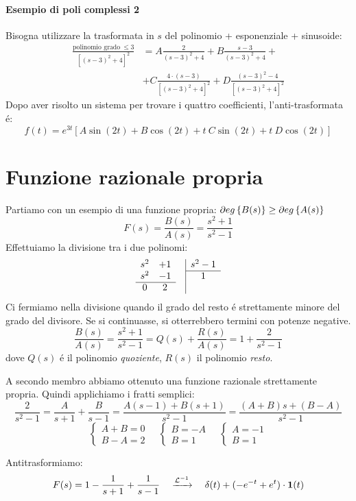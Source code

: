\documentclass[../main.tex]{subfiles}
\begin{document}
		\begin{mdframed}[style=Esempio]
			\paragraph{Esempio di poli complessi 2}
			Bisogna utilizzare la trasformata in $ s $ del polinomio + esponenziale + sinusoide:
			\begin{align*}
				\frac{\text{polinomio grado}\: \leq 3}{[(s-3)^2 + 4]^2} &= A \frac{2}{(s-3)^2 + 4} + B \frac{s - 3}{(s-3)^2 + 4} +
				\\
				&+ C \frac{4 \cdot (s-3)}{[(s-3)^2 + 4]^2} + D \frac{(s - 3)^2 - 4}{[(s-3)^2 + 4]^2}
			\end{align*}
			Dopo aver risolto un sistema per trovare i quattro coefficienti, l'anti-trasformata \'{e}:
			\[
				f(t) = e^{3t} [A \sin(2t) + B \cos(2t) + t\ C \sin(2t) + t\ D \cos(2t)]
			\]
		\end{mdframed}
	\section{Funzione razionale propria}
		\begin{mdframed}[style=Esempio]
			Partiamo con un esempio di una funzione propria: $ \partial eg \left\lbrace B(s) \right\rbrace \geq \partial eg \left\lbrace A(s) \right\rbrace $
			\[
				F(s) = \frac{B(s)}{A(s)} = \frac{s^2+1}{s^2-1}
			\]
			Effettuiamo la divisione tra i due polinomi:
			\[ 
				\begin{array}{ccc|c}
					s^2 & +1 & & s^2-1\\ \cline{4-4}
					s^2 & -1 & & 1\\ \cline{1-2}
					0 	& 2  & &
				\end{array}
			\]
			Ci fermiamo nella divisione quando il grado del resto \'e strettamente minore del grado del divisore. Se si continuasse, si otterrebbero termini con potenze negative.
			\[
				\frac{B(s)}{A(s)} = \frac{s^2+1}{s^2-1} = Q(s) + \frac{R(s)}{A(s)} = 1 + \frac{2}{s^2-1}
			\]
			dove $ Q(s) $ \'{e} il polinomio \textit{quoziente}, $ R(s) $ il polinomio \textit{resto}.
			
			A secondo membro abbiamo ottenuto una funzione razionale strettamente propria. Quindi applichiamo i fratti semplici:
			\[
				\frac{2}{s^2-1} = \frac{A}{s+1} + \frac{B}{s-1} = \frac{A(s-1) + B(s+1)}{s^2-1} = \frac{(A+B)s + (B-A)}{s^2-1}
			\]
			\[ 
				\begin{cases}
					A + B = 0\\
					B - A = 2
				\end{cases}\quad
				\begin{cases}
					B = -A\\
					B = 1
				\end{cases}\quad
				\begin{cases}
					A = -1\\
					B = 1
				\end{cases}
			\]
			
			Antitrasformiamo:
			\[
				F(s) = 1 - \frac{1}{s+1} + \frac{1}{s-1} \quad \xrightarrow{\mathcal{L}^{-1}} \quad  \delta(t) + (-e^{-t} + e^t) \cdot \textbf{1}(t)
			\]
		\end{mdframed}
	
\end{document}
